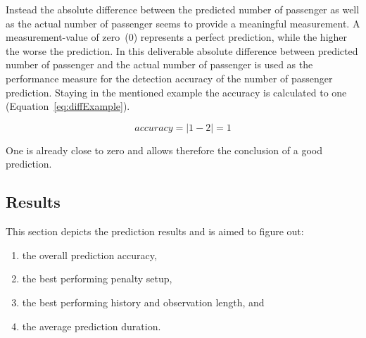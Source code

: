 Instead the absolute difference between the predicted number of passenger as well as the actual number of passenger seems to provide a meaningful measurement. A measurement-value of zero~(0) represents a perfect prediction, while the higher the worse the prediction. In this deliverable absolute difference between predicted number of passenger and the actual number of passenger is used as the performance measure for the detection accuracy of the number of passenger prediction.
Staying in the mentioned example the accuracy is calculated to one (Equation~\ref{eq:diffExample}).

\begin{equation}
accuracy = |1-2| = 1
\label{eq:diffExample}
\end{equation}

One is already close to zero and allows therefore the conclusion of a good prediction. 


\subsection{Results}
\label{subsec:results}

This section depicts the prediction results and is aimed to figure out:

\begin{enumerate}
  \item the overall prediction accuracy,
  \item the best performing penalty setup,
  \item the best performing history and observation length, and
  \item the average prediction duration.
\end{enumerate}

